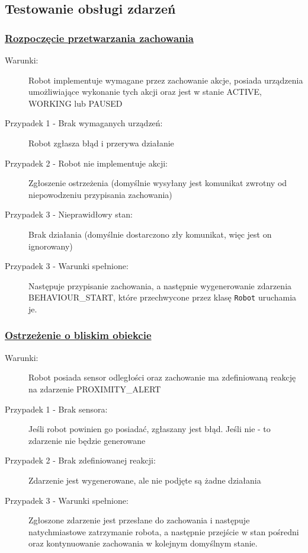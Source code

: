 \subsection{Testowanie obsługi zdarzeń}

\subsubsection{\underline{Rozpoczęcie przetwarzania zachowania}}

\begin{description}
    \item[Warunki:]Robot implementuje wymagane przez zachowanie akcje, posiada urządzenia umożliwiające wykonanie tych akcji oraz jest w stanie ACTIVE, WORKING lub PAUSED
    \item[Przypadek 1 - Brak wymaganych urządzeń:]Robot zgłasza błąd i przerywa działanie
    \item[Przypadek 2 - Robot nie implementuje akcji:]Zgłoszenie ostrzeżenia (domyślnie wysyłany jest komunikat zwrotny od niepowodzeniu przypisania zachowania)
    \item[Przypadek 3 - Nieprawidłowy stan:]Brak działania (domyślnie dostarczono zły komunikat, więc jest on ignorowany)
    \item[Przypadek 3 - Warunki spełnione:]Następuje przypisanie zachowania, a następnie wygenerowanie zdarzenia BEHAVIOUR\_START, które przechwycone przez klasę {\tt Robot} uruchamia je.\\
\end{description}

\subsubsection*{\underline{Ostrzeżenie o bliskim obiekcie}}

\begin{description}
    \item[Warunki:]Robot posiada sensor odległości oraz zachowanie ma zdefiniowaną reakcję na zdarzenie PROXIMITY\_ALERT
    \item[Przypadek 1 - Brak sensora:]Jeśli robot powinien go posiadać, zgłaszany jest błąd. Jeśli nie - to zdarzenie nie będzie generowane
    \item[Przypadek 2 - Brak zdefiniowanej reakcji:]Zdarzenie jest wygenerowane, ale nie podjęte są żadne działania
    \item[Przypadek 3 - Warunki spełnione:]Zgłoszone zdarzenie jest przesłane do zachowania i następuje natychmiastowe zatrzymanie robota, a następnie przejście w stan pośredni oraz kontynuowanie zachowania w kolejnym domyślnym stanie.\\
\end{description}

